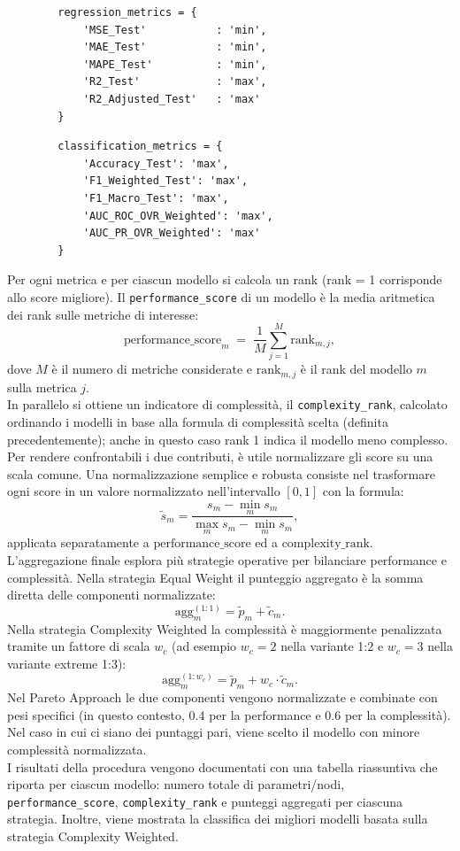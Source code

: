 \documentclass[a4paper,12pt]{report}
\begin{document}
	\begin{verbatim}
		regression_metrics = {
			'MSE_Test'           : 'min',
			'MAE_Test'           : 'min',
			'MAPE_Test'          : 'min',
			'R2_Test'            : 'max',
			'R2_Adjusted_Test'   : 'max'
		}
	\end{verbatim}
	\begin{verbatim}
		classification_metrics = {
			'Accuracy_Test': 'max',
			'F1_Weighted_Test': 'max',
			'F1_Macro_Test': 'max',
			'AUC_ROC_OVR_Weighted': 'max',
			'AUC_PR_OVR_Weighted': 'max'
		}
	\end{verbatim}
	
	Per ogni metrica e per ciascun modello si calcola un rank (rank = 1 corrisponde allo score migliore). Il \texttt{performance\_score} di un modello è la media aritmetica dei rank sulle metriche di interesse:
	\[
	\text{performance\_score}_m \;=\; \frac{1}{M}\sum_{j=1}^{M} \text{rank}_{m,j},
	\]
	dove \(M\) è il numero di metriche considerate e \(\text{rank}_{m,j}\) è il rank del modello \(m\) sulla metrica \(j\). \\
	In parallelo si ottiene un indicatore di complessità, il \texttt{complexity\_rank}, calcolato ordinando i modelli in base alla formula di complessità scelta (definita precedentemente); anche in questo caso rank 1 indica il modello meno complesso. Per rendere confrontabili i due contributi, è utile normalizzare gli score su una scala comune. Una normalizzazione semplice e robusta consiste nel trasformare ogni score in un valore normalizzato nell'intervallo \([0,1]\) con la formula:
	\[
	\tilde{s}_m = \frac{s_m - \min_m s_m}{\max_m s_m - \min_m s_m},
	\]
	applicata separatamente a \(\text{performance\_score}\) ed a \(\text{complexity\_rank}\). \\
	L'aggregazione finale esplora più strategie operative per bilanciare performance e complessità. Nella strategia Equal Weight il punteggio aggregato è la somma diretta delle componenti normalizzate:
	\[
	\text{agg}_{m}^{(1:1)} = \tilde{p}_m + \tilde{c}_m.
	\]
	Nella strategia Complexity Weighted la complessità è maggiormente penalizzata tramite un fattore di scala \(w_c\) (ad esempio \(w_c=2\) nella variante 1:2 e \(w_c=3\) nella variante extreme 1:3):
	\[
	\text{agg}_{m}^{(1:w_c)} = \tilde{p}_m + w_c \cdot \tilde{c}_m.
	\]
	Nel Pareto Approach le due componenti vengono normalizzate e combinate con pesi specifici (in questo contesto, 0.4 per la performance e 0.6 per la complessità). \\
	Nel caso in cui ci siano dei puntaggi pari, viene scelto il modello con minore complessità normalizzata. \\
	I risultati della procedura vengono documentati con una tabella riassuntiva che riporta per ciascun modello: numero totale di parametri/nodi, \texttt{performance\_score}, \texttt{complexity\_rank} e punteggi aggregati per ciascuna strategia. Inoltre, viene mostrata la classifica dei migliori modelli basata sulla strategia Complexity Weighted.
	
\end{document}
